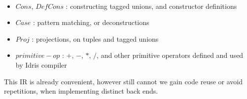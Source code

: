 \documentclass[a1,portrait]{a1poster}
\begin{document}
\begin{multicols}{2}
\begin{multicols}{2}
\begin{minipage}[b]{1\linewidth}
\begin{bnf*}
    \\
    \\
    \\
    \\
    \\   
    \\
    \\
    \\
    \\
    \\
    \\
\end{bnf*}
\end{minipage}
\end{multicols}

\vspace{-0.5cm}

\begin{itemize}
    \setlength\itemsep{-0.2em}
    \item $Cons$, $DefCons$ : constructing tagged unions, and constructor definitions
    \item $Case$ : pattern matching, or deconstructions
    \item $Proj$ : projections, on tuples and tagged unions
    \item $primitive-op$ : $+$, $-$, $*$, $/$, and other primitive operators defined and used by Idris compiler

\end{itemize}

This IR is already convenient, however still cannot we gain code reuse or avoid repetitions,
when implementing distinct back ends.


\end{multicols}
\end{document}
